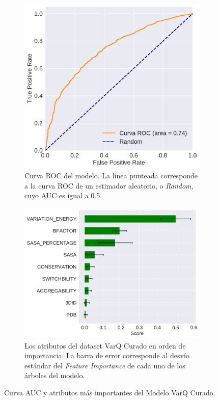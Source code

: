 \begin{figure}[H]
\centering
\begin{subfigure}{0.7\textwidth}
    \includegraphics[width=\textwidth]{documents/latex/figures/3/varq/auc_varq.pdf}
    \caption{Curva ROC del modelo. La línea punteada corresponde a la curva ROC de un estimador aleatorio, o \textit{Random}, cuyo AUC es igual a 0.5.}
    \label{fig:auc_varq}
\end{subfigure}
\begin{subfigure}{0.7\textwidth}
    \includegraphics[width=\textwidth]{documents/latex/figures/3/varq/importances_varq.pdf}
    \caption{Los atributos del dataset VarQ Curado en orden de importancia. La barra de error corresponde al desvío estándar del \textit{Feature Importance} de cada uno de los árboles del modelo.}
    \label{fig:importance_varq}
\end{subfigure}

\caption{Curva AUC y atributos más importantes del Modelo VarQ Curado.}

\end{figure}